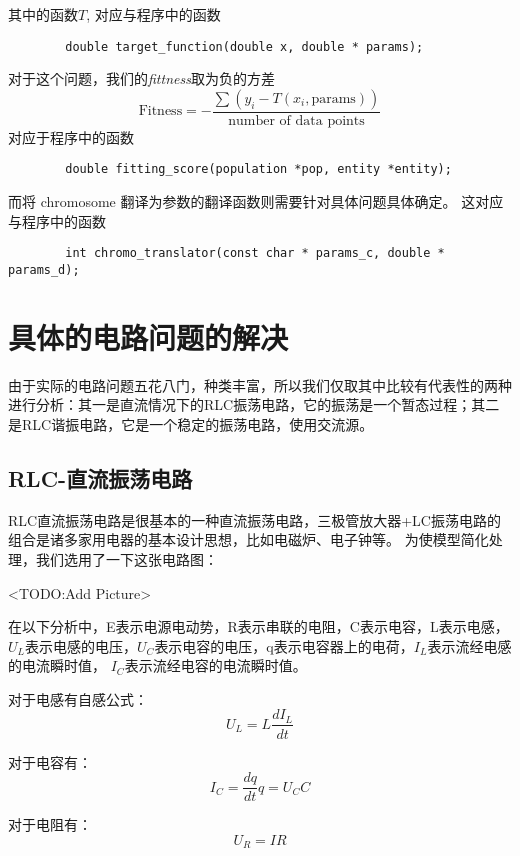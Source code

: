 \documentclass[a4paper]{article}
\begin{document}
其中的函数$T$, 对应与程序中的函数
\begin{verbatim}
        double target_function(double x, double * params);
\end{verbatim}

对于这个问题，我们的\emph{fittness}取为负的方差
\begin{equation}
	\text{Fitness} = - \frac{\sum (y_i - T(x_i, \text{params}))}{\text{number of data points}} 
\end{equation}
对应于程序中的函数
\begin{verbatim}
        double fitting_score(population *pop, entity *entity);
\end{verbatim}

而将 chromosome 翻译为参数的翻译函数则需要针对具体问题具体确定。
这对应与程序中的函数
\begin{verbatim}
        int chromo_translator(const char * params_c, double * params_d);
\end{verbatim}

\section{具体的电路问题的解决}
由于实际的电路问题五花八门，种类丰富，所以我们仅取其中比较有代表性的两种进行分析：其一是直流情况下的RLC振荡电路，它的振荡是一个暂态过程；其二是RLC谐振电路，它是一个稳定的振荡电路，使用交流源。
\subsection{RLC-直流振荡电路}
RLC直流振荡电路是很基本的一种直流振荡电路，三极管放大器+LC振荡电路的组合是诸多家用电器的基本设计思想，比如电磁炉、电子钟等。
为使模型简化处理，我们选用了一下这张电路图：

<TODO:Add Picture>

在以下分析中，E表示电源电动势，R表示串联的电阻，C表示电容，L表示电感，$U_L$表示电感的电压，$U_C$表示电容的电压，q表示电容器上的电荷，$I_L$表示流经电感的电流瞬时值，
$I_C$表示流经电容的电流瞬时值。

对于电感有自感公式：
\begin{equation}
U_L=L\frac{dI_L}{dt}
\end{equation}

对于电容有：
\begin{equation}
I_C=\frac{dq}{dt}
q=U_CC
\end{equation}

对于电阻有：
\begin{equation}
U_R=IR
\end{equation}
\end{document}
